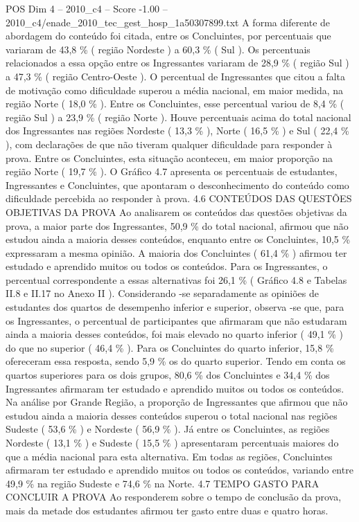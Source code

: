 \begin{textsample}{POS Dim 4 – 2010\_c4 – Score -1.00 – 2010\_c4/enade\_2010\_tec\_gest\_hosp\_1a50307899.txt}
A forma diferente de abordagem do conteúdo foi citada, entre os Concluintes, por percentuais que variaram de 43,8 \% ( região Nordeste ) a 60,3 \% ( Sul ).
Os percentuais relacionados a essa opção entre os Ingressantes variaram de 28,9 \% ( região Sul ) a 47,3 \% ( região Centro-Oeste ).
O percentual de Ingressantes que citou a falta de motivação como dificuldade superou a média nacional, em maior medida, na região Norte ( 18,0 \% ).
Entre os Concluintes, esse percentual variou de 8,4 \% ( região Sul ) a 23,9 \% ( região Norte ).
Houve percentuais acima do total nacional dos Ingressantes nas regiões Nordeste ( 13,3 \% ), Norte ( 16,5 \% ) e Sul ( 22,4 \% ), com declarações de que não tiveram qualquer dificuldade para responder à prova.
Entre os Concluintes, esta situação aconteceu, em maior proporção na região Norte ( 19,7 \% ).
O Gráfico 4.7 apresenta os percentuais de estudantes, Ingressantes e Concluintes, que apontaram o desconhecimento do conteúdo como dificuldade percebida ao responder à prova. 4.6 CONTEÚDOS DAS QUESTÕES OBJETIVAS DA PROVA Ao analisarem os conteúdos das questões objetivas da prova, a maior parte dos Ingressantes, 50,9 \% do total nacional, afirmou que não estudou ainda a maioria desses conteúdos, enquanto entre os Concluintes, 10,5 \% expressaram a mesma opinião.
A maioria dos Concluintes ( 61,4 \% ) afirmou ter estudado e aprendido muitos ou todos os conteúdos.
Para os Ingressantes, o percentual correspondente a essas alternativas foi 26,1 \% ( Gráfico 4.8 e Tabelas II.8 e II.17 no Anexo II ).
Considerando -se separadamente as opiniões de estudantes dos quartos de desempenho inferior e superior, observa -se que, para os Ingressantes, o percentual de participantes que afirmaram que não estudaram ainda a maioria desses conteúdos, foi mais elevado no quarto inferior ( 49,1 \% ) do que no superior ( 46,4 \% ).
Para os Concluintes do quarto inferior, 15,8 \% ofereceram essa resposta, sendo 5,9 \% os do quarto superior.
Tendo em conta os quartos superiores para os dois grupos, 80,6 \% dos Concluintes e 34,4 \% dos Ingressantes afirmaram ter estudado e aprendido muitos ou todos os conteúdos.
Na análise por Grande Região, a proporção de Ingressantes que afirmou que não estudou ainda a maioria desses conteúdos superou o total nacional nas regiões Sudeste ( 53,6 \% ) e Nordeste ( 56,9 \% ).
Já entre os Concluintes, as regiões Nordeste ( 13,1 \% ) e Sudeste ( 15,5 \% ) apresentaram percentuais maiores do que a média nacional para esta alternativa.
Em todas as regiões, Concluintes afirmaram ter estudado e aprendido muitos ou todos os conteúdos, variando entre 49,9 \% na região Sudeste e 74,6 \% na Norte. 4.7 TEMPO GASTO PARA CONCLUIR A PROVA Ao responderem sobre o tempo de conclusão da prova, mais da metade dos estudantes afirmou ter gasto entre duas e quatro horas.

\end{textsample}
